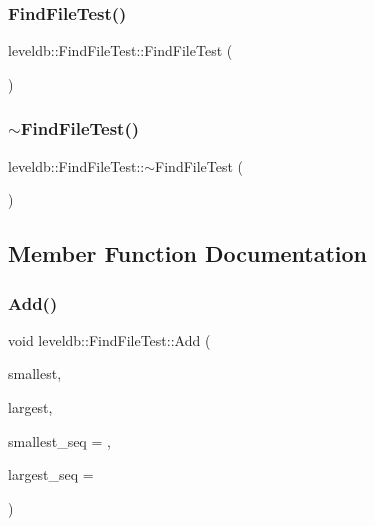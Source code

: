 \subsubsection{\texorpdfstring{FindFileTest()}{FindFileTest()}}
{\footnotesize\ttfamily leveldb\+::\+Find\+File\+Test\+::\+Find\+File\+Test (\begin{DoxyParamCaption}{ }\end{DoxyParamCaption})\hspace{0.3cm}{\ttfamily [inline]}}

\mbox{\label{classleveldb_1_1_find_file_test_a147a326f046217d4a6cf737d3346bde7}} 
\subsubsection{\texorpdfstring{$\sim$FindFileTest()}{~FindFileTest()}}
{\footnotesize\ttfamily leveldb\+::\+Find\+File\+Test\+::$\sim$\+Find\+File\+Test (\begin{DoxyParamCaption}{ }\end{DoxyParamCaption})\hspace{0.3cm}{\ttfamily [inline]}}



\subsection{Member Function Documentation}
\mbox{\label{classleveldb_1_1_find_file_test_a7daf932b5d9881438c6edb5f7881901c}} 
\subsubsection{\texorpdfstring{Add()}{Add()}}
{\footnotesize\ttfamily void leveldb\+::\+Find\+File\+Test\+::\+Add (\begin{DoxyParamCaption}\item[{const char $\ast$}]{smallest,  }\item[{const char $\ast$}]{largest,  }\item[{\mbox{\hyperlink{namespaceleveldb_a5481ededd221c36d652c371249f869fa}{Sequence\+Number}}}]{smallest\+\_\+seq = {},  }\item[{\mbox{\hyperlink{namespaceleveldb_a5481ededd221c36d652c371249f869fa}{Sequence\+Number}}}]{largest\+\_\+seq = {} }\end{DoxyParamCaption})\hspace{0.3cm}{\ttfamily [inline]}}

